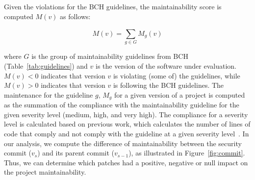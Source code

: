 \documentclass[10pt,conference]{IEEEtran}
\begin{document}


Given the violations for the BCH guidelines, the maintainability score is computed
$M(v)$ as follows:

\begin{equation}
    M(v) = \sum_{g \in G}^{} M_{g}(v)
\end{equation}

\noindent
where $G$ is the group of maintainability guidelines from BCH
(Table~\ref{tab:guidelines}) and $v$ is the version of the software under
evaluation. $M(v) < 0$ indicates that version $v$ is violating (some of) the
guidelines, while $M(v) > 0$ indicates that version $v$ is following
the BCH guidelines. The maintenance for the guideline $g$, $M_g$ for a given version
of a project is computed as the summation of the compliance with the 
maintainability guideline for the given severity level (medium, high, and very high).
The compliance for a severity level
is calculated based on previous work, which calculates the number of lines of code that comply and not comply
with the guideline at a given severity level~\cite{cruz2019energyoriented}. In our analysis, we compute 
the difference of maintainability between the security commit ($v_{s}$) and its parent 
commit ($v_{s-1}$), as illustrated in Figure~\ref{fig:commit}. Thus, we can determine 
which patches had a positive, negative or null impact on the project maintainability. 
\end{document}
